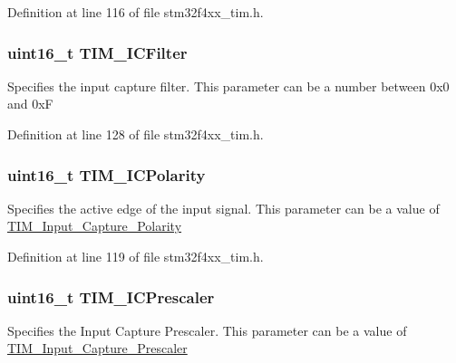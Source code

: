 Definition at line 116 of file stm32f4xx\-\_\-tim.\-h.

\hypertarget{struct_t_i_m___i_c_init_type_def_a751574b5d1f66bea6c3405d2975e420a}{
\subsubsection[{T\-I\-M\-\_\-\-I\-C\-Filter}]{\setlength{\rightskip}{0pt plus 5cm}uint16\-\_\-t T\-I\-M\-\_\-\-I\-C\-Filter}}\label{struct_t_i_m___i_c_init_type_def_a751574b5d1f66bea6c3405d2975e420a}
Specifies the input capture filter. This parameter can be a number between 0x0 and 0x\-F 

Definition at line 128 of file stm32f4xx\-\_\-tim.\-h.

\hypertarget{struct_t_i_m___i_c_init_type_def_a71dc0cc2f4eb59451ea323719b0741bb}{
\subsubsection[{T\-I\-M\-\_\-\-I\-C\-Polarity}]{\setlength{\rightskip}{0pt plus 5cm}uint16\-\_\-t T\-I\-M\-\_\-\-I\-C\-Polarity}}\label{struct_t_i_m___i_c_init_type_def_a71dc0cc2f4eb59451ea323719b0741bb}
Specifies the active edge of the input signal. This parameter can be a value of \hyperlink{group___t_i_m___input___capture___polarity}{T\-I\-M\-\_\-\-Input\-\_\-\-Capture\-\_\-\-Polarity} 

Definition at line 119 of file stm32f4xx\-\_\-tim.\-h.

\hypertarget{struct_t_i_m___i_c_init_type_def_abdff50beb0809a640ccf2cebde439a00}{
\subsubsection[{T\-I\-M\-\_\-\-I\-C\-Prescaler}]{\setlength{\rightskip}{0pt plus 5cm}uint16\-\_\-t T\-I\-M\-\_\-\-I\-C\-Prescaler}}\label{struct_t_i_m___i_c_init_type_def_abdff50beb0809a640ccf2cebde439a00}
Specifies the Input Capture Prescaler. This parameter can be a value of \hyperlink{group___t_i_m___input___capture___prescaler}{T\-I\-M\-\_\-\-Input\-\_\-\-Capture\-\_\-\-Prescaler} 

